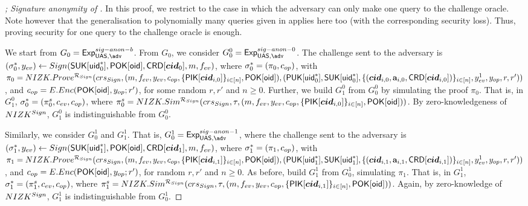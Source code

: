 \begin{proof}[; Signature anonymity of \CUASGen]

  In this proof, we restrict to the case in which the adversary can only make
  one query to the challenge oracle. Note however that the generalisation to
  polynomially many queries given in \cite{bsz05} applies here too (with the
  corresponding security loss). Thus, proving security for one query to the
  challenge oracle is enough.

  We start from $G_0=\ExpSigAnonb$.  %
  From $G_0$, we consider $G^0_0 = \ExpSigAnonz$. The challenge sent to the
  adversary is $(\mathsf{\sigma}^*_0,y_{ev}) \gets Sign(\mathsf{S}\mathsf{UK}[\mathsf{uid}^*_0],\mathsf{P}\mathsf{OK}[\mathsf{oid}],
  \mathsf{CRD}[\boldsymbol{cid}_0],m,f_{ev})$, where $\mathsf{\sigma}^*_0 = (\pi_0,c_{op})$, with
  $\pi_0 = NIZK.Prove^{\mathcal{R}_{Sign}}(crs_{Sign},(m,f_{ev},y_{ev},
  c_{op},\lbrace\mathsf{P}\mathsf{IK}[\boldsymbol{cid}_{i,0}]\rbrace_{i\in[n]},\mathsf{P}\mathsf{OK}[\mathsf{oid}]),
  (\mathsf{P}\mathsf{UK}[\mathsf{uid}^*_0],\mathsf{S}\mathsf{UK}[\mathsf{uid}^*_0],\lbrace (\boldsymbol{cid}_{i,0},\mathbf{a}_{i,0},
  \mathsf{CRD}[\boldsymbol{cid}_{i,0}]) \rbrace_{i\in[n]},y_{ev}^1,y_{op},r,r'))$, and $c_{op} =
  E.Enc(\mathsf{P}\mathsf{OK}[\mathsf{oid}],y_{op};r')$, for some random $r,r'$ and $n \ge 0$.
  Further, we build $G_1^0$ from $G_0^0$ by simulating the proof $\pi_0$. That
  is, in $G_1^0$, $\mathsf{\sigma}^*_0 = (\pi_0^s,c_{ev},c_{op})$, where $\pi^s_0 =
  NIZK.Sim^{\mathcal{R}_{Sign}}(crs_{Sign},\tau,(m,f_{ev},y_{ev},
  c_{op},\lbrace\mathsf{P}\mathsf{IK}[\boldsymbol{cid}_{i,0}]\rbrace_{i\in[n]},\mathsf{P}\mathsf{OK}[\mathsf{oid}]))$. By
  zero-knowledgeness of $NIZK^{Sign}$, $G_1^0$ is indistinguishable from
  $G_0^0$.

  Similarly, we consider $G_0^1$ and $G_1^1$. That is, $G_0^1 = \ExpSigAnono$,
  where the challenge
  sent to the adversary is $(\mathsf{\sigma}^*_1,y_{ev}) \gets Sign(\mathsf{S}\mathsf{UK}[\mathsf{uid}^*_1],
  \mathsf{P}\mathsf{OK}[\mathsf{oid}],\mathsf{CRD}[\boldsymbol{cid}_1],m,f_{ev})$, where $\mathsf{\sigma}^*_1 = (\pi_1,
  c_{op})$, with $\pi_1 = NIZK.Prove^{\mathcal{R}_{Sign}}(crs_{Sign},
  (m,f_{ev},y_{ev},
  c_{op},\lbrace\mathsf{P}\mathsf{IK}[\boldsymbol{cid}_{i,1}]\rbrace_{i\in[n]},\mathsf{P}\mathsf{OK}[\mathsf{oid}]),
  (\mathsf{P}\mathsf{UK}[\mathsf{uid}^*_1],\mathsf{S}\mathsf{UK}[\mathsf{uid}^*_1],\lbrace (\boldsymbol{cid}_{i,1},\mathbf{a}_{i,1},
  \mathsf{CRD}[\boldsymbol{cid}_{i,1}]) \rbrace_{i\in[n]},y_{ev}^1,y_{op},r,r'))$, and
  $c_{op} = E.Enc(\mathsf{P}\mathsf{OK}[\mathsf{oid}],y_{op};r')$, for random $r,r'$ and $n \ge 0$. As
  before, build $G_1^1$ from $G_0^1$, simulating $\pi_1$. That is, in $G_1^1$,
  $\mathsf{\sigma}^*_1 = (\pi_1^s,c_{ev},c_{op})$, where $\pi^s_1 =
  NIZK.Sim^{\mathcal{R}_{Sign}}(crs_{Sign},\tau,(m,f_{ev},y_{ev},
  c_{op},\lbrace\mathsf{P}\mathsf{IK}[\boldsymbol{cid}_{i,1}]\rbrace_{i\in[n]},\mathsf{P}\mathsf{OK}[\mathsf{oid}]))$. Again, by
  zero-knowledge of $NIZK^{Sign}$, $G_1^1$ is
  indistinguishable from $G_0^1$.


\end{proof}
